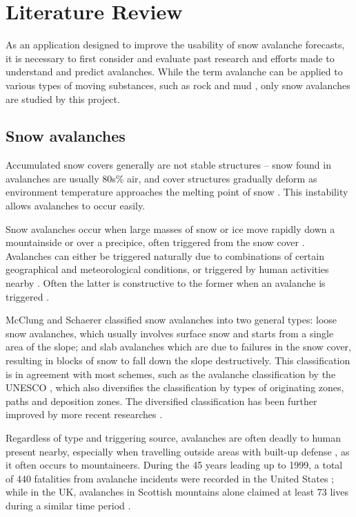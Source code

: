 \documentclass[openany]{UoYCSproject}
\begin{document}
\chapter{Literature Review} \label{ch:lit-review}

As an application designed to improve the usability of snow avalanche forecasts, it is necessary to first consider and evaluate past research and efforts made to understand and predict avalanches. While the term avalanche can be applied to various types of moving substances, such as rock and mud \cite[p. 1]{91097820150101}, only snow avalanches are studied by this project.

\section{Snow avalanches}

Accumulated snow covers generally are not stable structures -- snow found in avalanches are usually 80s\% air, and cover structures gradually deform as environment temperature approaches the melting point of snow \cite[p. 16]{mcclung2006avalanche}. This instability allows avalanches to occur easily.

Snow avalanches occur when large masses of snow or ice move rapidly down a mountainside or over a precipice, often triggered from the snow cover \cite[p. 1]{91097820150101}. Avalanches can either be triggered naturally due to combinations of certain geographical \cite[p. 17]{91097820150101} and meteorological \cite[p. 23]{91097820150101} conditions, or triggered by human activities nearby \cite{schweizer2001characteristics}. Often the latter is constructive to the former when an avalanche is triggered \cite[p. 17]{mcclung2006avalanche}\cite[p .48]{scottish-avalanches}.

McClung and Schaerer \cite[p. 73]{mcclung2006avalanche} classified snow avalanches into two general types: loose snow avalanches, which usually involves surface snow and starts from a single area of the slope; and slab avalanches which are due to failures in the snow cover, resulting in blocks of snow to fall down the slope destructively. This classification is in agreement with most schemes, such as the avalanche classification by the UNESCO \cite{unesco-avalanche}, which also diversifies the classification by types of originating zones, paths and deposition zones. The diversified classification has been further improved by more recent researches \cite{91097820150101}.

Regardless of type and triggering source, avalanches are often deadly to human present nearby, especially when travelling outside areas with built-up defense \cite{91097820150101}, as it often occurs to mountaineers. During the 45 years leading up to 1999, a total of 440 fatalities from avalanche incidents were recorded in the United States \cite{PAGE1999146}; while in the UK, avalanches in Scottish mountains alone claimed at least 73 lives during a similar time period \cite{scottish-avalanches}. 
\end{document}
